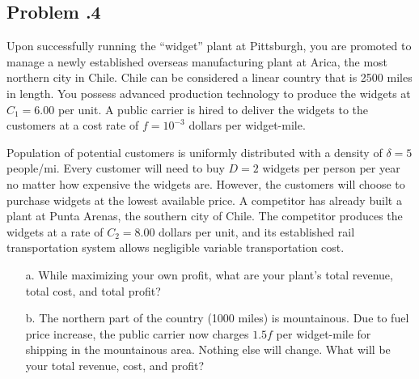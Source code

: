 \documentclass[12pt]{article}
\newcommand{\customsubsection}[1]{
  \subsection*{Problem \thesection.#1}
}
\begin{document}
\newpage



\customsubsection{4}
Upon successfully running the “widget” plant at Pittsburgh, you are promoted to manage a newly established overseas manufacturing plant at Arica, the most northern city in Chile. Chile can be considered a linear country that is 2500 miles in length. You possess advanced production technology to produce the widgets at $C_1 = 6.00$ per unit. A public carrier is hired to deliver the widgets to the customers at a cost rate of $f = 10^{-3}$ dollars per widget-mile.

Population of potential customers is uniformly distributed with a density of $\delta = 5$ people/mi. Every customer will need to buy $D = 2$ widgets per person per year no matter how expensive the widgets are. However, the customers will choose to purchase widgets at the lowest available price. A competitor has already built a plant at Punta Arenas, the southern city of Chile. The competitor produces the widgets at a rate of $C_2 = 8.00$ dollars per unit, and its established rail transportation system allows negligible variable transportation cost.

\begin{itemize}
    \item [a.] While maximizing your own profit, what are your plant’s total revenue, total cost, and total profit?
    \item [b.] The northern part of the country (1000 miles) is mountainous. Due to fuel price increase, the public carrier now charges $1.5f$ per widget-mile for shipping in the mountainous area. Nothing else will change. What will be your total revenue, cost, and profit?
\end{itemize}
\end{document}
